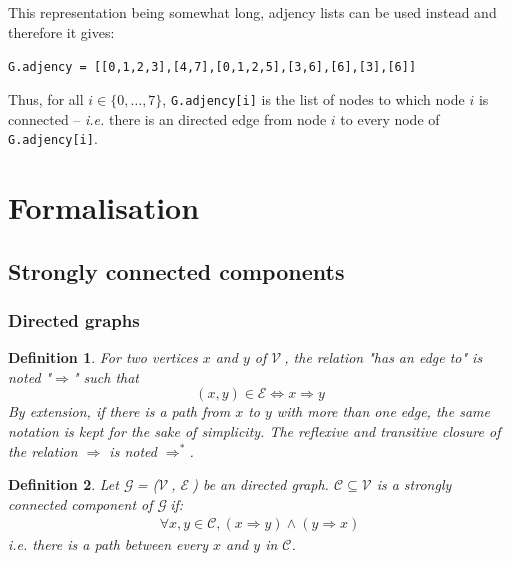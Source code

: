 \documentclass[a4 paper, 12pt]{article}
\def\GG{$\mathcal{G}~$}
\def\VV{$\mathcal{V}~$}
\def\EE{$\mathcal{E}~$}
\newtheorem{definition}{Definition}
\begin{document}
This representation being somewhat long, adjency lists can be used instead and therefore it gives:
\begin{center}
    \texttt{G.adjency = [[0,1,2,3],[4,7],[0,1,2,5],[3,6],[6],[3],[6]]}
\end{center}
Thus, for all $i \in \{0,\ldots,7\}$, \texttt{G.adjency[i]} is the list of nodes to which node $i$ is connected -- \textit{i.e.} there is an directed edge from node $i$ to every node of \texttt{G.adjency[i]}.
\pagebreak

\section{Formalisation}
\subsection{Strongly connected components}
\subsubsection{Directed graphs}
\begin{definition}
    For two vertices $x$ and $y$ of \VV, the relation "has an edge to" is noted "$\Rightarrow$" such that
    \begin{equation*}
        (x, y) \in \mathcal{E} \Longleftrightarrow x \Rightarrow y
    \end{equation*}
    By extension, if there is a path from $x$ to $y$ with more than one edge, the same notation is kept for the sake of simplicity.
    The reflexive and transitive closure of the relation $\Rightarrow$ is noted $\Rightarrow^*$.
\end{definition}

\begin{definition}
    Let \GG = (\VV, \EE) be an directed graph.
$\mathcal{C} \subseteq \mathcal{V}$ is a strongly connected component of \GG if:
\begin{gather*}
    \forall x, y \in \mathcal{C}, (x \Rightarrow y) \wedge (y \Rightarrow x)
\end{gather*}
\textit{i.e.} there is a path between every $x$ and $y$ in $\mathcal{C}$.\\

\end{definition}
\end{document}
